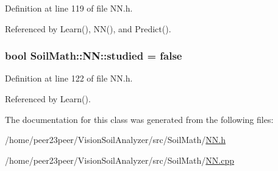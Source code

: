 Definition at line 119 of file N\+N.\+h.



Referenced by Learn(), N\+N(), and Predict().

\hypertarget{class_soil_math_1_1_n_n_aed36297c9221a837fee94f4774b614bf}{}
\subsubsection[{studied}]{\setlength{\rightskip}{0pt plus 5cm}bool Soil\+Math\+::\+N\+N\+::studied = false\hspace{0.3cm}{\ttfamily [private]}}\label{class_soil_math_1_1_n_n_aed36297c9221a837fee94f4774b614bf}


Definition at line 122 of file N\+N.\+h.



Referenced by Learn().



The documentation for this class was generated from the following files\+:\begin{DoxyCompactItemize}
\item 
/home/peer23peer/\+Vision\+Soil\+Analyzer/src/\+Soil\+Math/\hyperlink{_n_n_8h}{N\+N.\+h}\item 
/home/peer23peer/\+Vision\+Soil\+Analyzer/src/\+Soil\+Math/\hyperlink{_n_n_8cpp}{N\+N.\+cpp}\end{DoxyCompactItemize}
